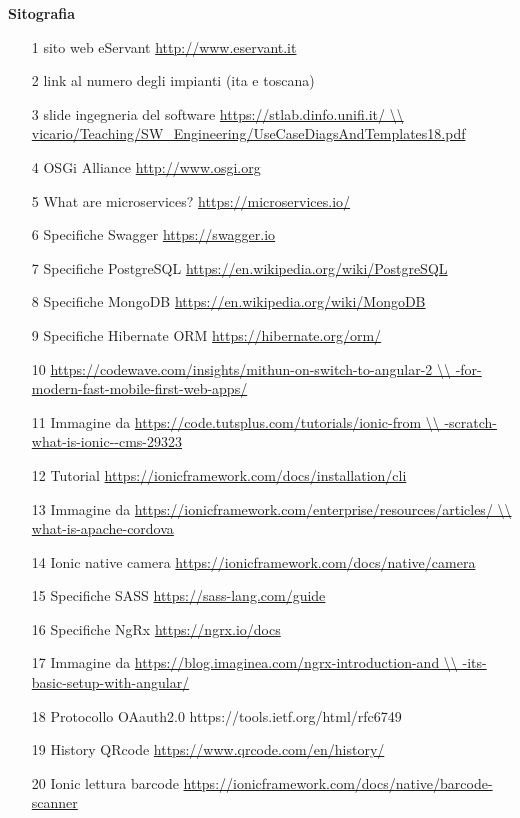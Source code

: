 \textbf{Sitografia}
\begin{itemize}
\item [1] sito web eServant \url{http://www.eservant.it}
\item [2] link al numero degli impianti (ita e toscana)
\item [3] slide ingegneria del software \url{https://stlab.dinfo.unifi.it/ \\
vicario/Teaching/SW_Engineering/UseCaseDiagsAndTemplates18.pdf}
\item [4] OSGi Alliance \url{http://www.osgi.org}
\item [5] What are microservices? \url{https://microservices.io/}
\item [6] Specifiche Swagger \url{https://swagger.io}
\item [7] Specifiche PostgreSQL \url{https://en.wikipedia.org/wiki/PostgreSQL}
\item [8] Specifiche MongoDB \url{https://en.wikipedia.org/wiki/MongoDB}
\item [9] Specifiche Hibernate ORM \url{https://hibernate.org/orm/}
\item [10] \url{https://codewave.com/insights/mithun-on-switch-to-angular-2 \\
-for-modern-fast-mobile-first-web-apps/}
\item [11] Immagine da \url{https://code.tutsplus.com/tutorials/ionic-from \\
-scratch-what-is-ionic--cms-29323}
\item [12] Tutorial \url{https://ionicframework.com/docs/installation/cli}
\item [13] Immagine da \url{https://ionicframework.com/enterprise/resources/articles/ \\
what-is-apache-cordova}
\item [14] Ionic native camera \url{https://ionicframework.com/docs/native/camera}
\item [15] Specifiche SASS \url{https://sass-lang.com/guide}
\item [16] Specifiche NgRx \url{https://ngrx.io/docs}
\item [17] Immagine da \url{https://blog.imaginea.com/ngrx-introduction-and \\
-its-basic-setup-with-angular/}
\item [18] Protocollo OAauth2.0 https://tools.ietf.org/html/rfc6749
\item [19] History QRcode \url{https://www.qrcode.com/en/history/}
\item [20] Ionic lettura barcode \url{https://ionicframework.com/docs/native/barcode-scanner}

\end{itemize}

